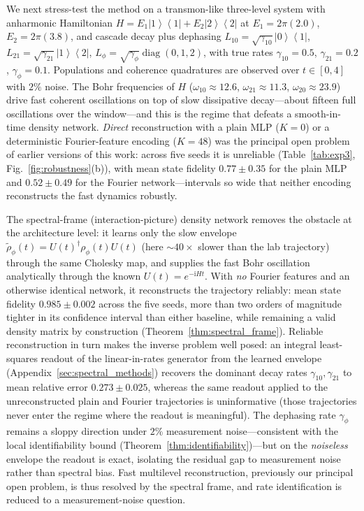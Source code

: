 \documentclass[twocolumn,aps,prxquantum,superscriptaddress,nofootinbib,floatfix,longbibliography]{revtex4-2}
\DeclareMathOperator{\diag}{diag}
\newcommand{\ii}{\mathrm{i}}
\newcommand{\ket}[1]{\left\lvert #1 \right\rangle}
\newcommand{\bra}[1]{\left\langle #1 \right\rvert}
\newcommand{\proj}[1]{\ket{#1}\!\bra{#1}}
\newcommand{\sync}[1]{#1}
\begin{document}
We next stress-test the method on a transmon-like three-level system with anharmonic Hamiltonian $H=E_1\proj{1}+E_2\proj{2}$ at $E_1=2\pi(2.0)$, $E_2=2\pi(3.8)$, and cascade decay plus dephasing $L_{10}=\sqrt{\gamma_{10}}\ket{0}\bra{1}$, $L_{21}=\sqrt{\gamma_{21}}\ket{1}\bra{2}$, $L_\phi=\sqrt{\gamma_\phi}\diag(0,1,2)$, with true rates $\gamma_{10}=0.5$, $\gamma_{21}=0.2$, $\gamma_\phi=0.1$. Populations and coherence quadratures are observed over $t\in[0,4]$ with $2\%$ noise. The Bohr frequencies of $H$ ($\omega_{10}\approx12.6$, $\omega_{21}\approx11.3$, $\omega_{20}\approx23.9$) drive fast coherent oscillations on top of slow dissipative decay---about fifteen full oscillations over the window---and this is the regime that defeats a smooth-in-time density network. \emph{Direct} reconstruction with a plain MLP ($K=0$) or a deterministic Fourier-feature encoding ($K=48$) was the principal open problem of earlier versions of this work: across five seeds it is unreliable (Table~\ref{tab:exp3}, Fig.~\ref{fig:robustness}(b)), with mean state fidelity $\sync{0.77}\pm\sync{0.35}$ for the plain MLP and $\sync{0.52}\pm\sync{0.49}$ for the Fourier network---intervals so wide that neither encoding reconstructs the fast dynamics robustly.

The spectral-frame (interaction-picture) density network removes the obstacle at the architecture level: it learns only the slow envelope $\widetilde\rho_\phi(t)=U(t)^\dagger\rho_\phi(t)U(t)$ (here $\sim40\times$ slower than the lab trajectory) through the same Cholesky map, and supplies the fast Bohr oscillation analytically through the known $U(t)=e^{-\ii Ht}$. With \emph{no} Fourier features and an otherwise identical network, it reconstructs the trajectory reliably: mean state fidelity $\sync{0.985}\pm\sync{0.002}$ across the five seeds, more than two orders of magnitude tighter in its confidence interval than either baseline, while remaining a valid density matrix by construction (Theorem~\ref{thm:spectral_frame}). Reliable reconstruction in turn makes the inverse problem well posed: an integral least-squares readout of the linear-in-rates generator from the learned envelope (Appendix~\ref{sec:spectral_methods}) recovers the dominant decay rates $\gamma_{10},\gamma_{21}$ to mean relative error $\sync{0.273}\pm\sync{0.025}$, whereas the same readout applied to the unreconstructed plain and Fourier trajectories is uninformative (those trajectories never enter the regime where the readout is meaningful). The dephasing rate $\gamma_\phi$ remains a sloppy direction under $2\%$ measurement noise---consistent with the local identifiability bound (Theorem~\ref{thm:identifiability})---but on the \emph{noiseless} envelope the readout is exact, isolating the residual gap to measurement noise rather than spectral bias. Fast multilevel reconstruction, previously our principal open problem, is thus resolved by the spectral frame, and rate identification is reduced to a measurement-noise question.
\end{document}
